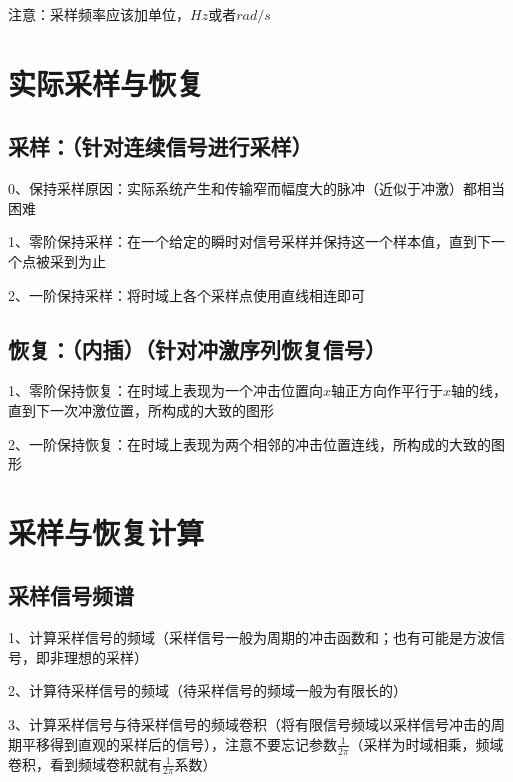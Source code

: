注意：采样频率应该加单位，$Hz$或者$rad/s$

\section{实际采样与恢复}



\subsection{采样：（针对连续信号进行采样）}

0、保持采样原因：实际系统产生和传输窄而幅度大的脉冲（近似于冲激）都相当困难

1、零阶保持采样：在一个给定的瞬时对信号采样并保持这一个样本值，直到下一个点被采到为止

2、一阶保持采样：将时域上各个采样点使用直线相连即可



\subsection{恢复：（内插）（针对冲激序列恢复信号）}

1、零阶保持恢复：在时域上表现为一个冲击位置向$x$轴正方向作平行于$x$轴的线，直到下一次冲激位置，所构成的大致的图形

2、一阶保持恢复：在时域上表现为两个相邻的冲击位置连线，所构成的大致的图形

\section{采样与恢复计算}



\subsection{采样信号频谱}

1、计算采样信号的频域（采样信号一般为周期的冲击函数和；也有可能是方波信号，即非理想的采样）

2、计算待采样信号的频域（待采样信号的频域一般为有限长的）

3、计算采样信号与待采样信号的频域卷积（将有限信号频域以采样信号冲击的周期平移得到直观的采样后的信号），注意不要忘记参数$\frac 1{2\pi}$（采样为时域相乘，频域卷积，看到频域卷积就有$\frac 1{2\pi}$系数）

